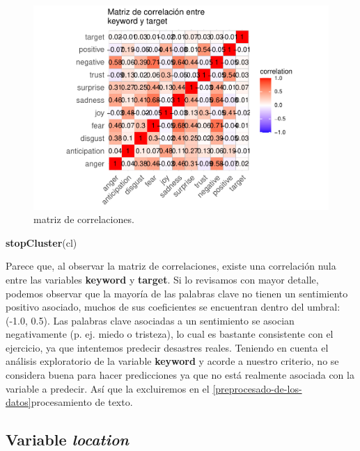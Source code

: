\documentclass[]{article}
\newenvironment{Shaded}{\begin{snugshade}}{\end{snugshade}}
\newcommand{\KeywordTok}[1]{\textcolor[rgb]{0.13,0.29,0.53}{\textbf{#1}}}
\newcommand{\NormalTok}[1]{#1}
\begin{document}
\begin{figure}
	\begin{center}
		\includegraphics[width=1\linewidth]{document_files/figure-latex/unnamed-chunk-7-1} 
		\caption{matriz de correlaciones.}
		\label{fig: matriz de correlaciones}
	\end{center}
\end{figure}

\begin{Shaded}
\begin{Highlighting}[]
\KeywordTok{stopCluster}\NormalTok{(cl)}
\end{Highlighting}
\end{Shaded}

\newpage

Parece que, al observar la matriz de correlaciones, existe una correlación nula entre las variables \textbf{keyword} y \textbf{target}. Si lo revisamos con mayor detalle, podemos observar que la mayoría de las
palabras clave no tienen un sentimiento positivo asociado, muchos de sus coeficientes se encuentran dentro del umbral: (-1.0, 0.5). Las palabras clave asociadas a un sentimiento se asocian negativamente (p. ej. miedo o
tristeza), lo cual es bastante consistente con el ejercicio, ya que intentemos predecir desastres reales. Teniendo en cuenta el análisis exploratorio de la variable \textbf{keyword} y acorde a nuestro criterio, no se considera buena para hacer predicciones ya que no está realmente asociada con la variable a
predecir. Así que la excluiremos en el \ref{preprocesado-de-los-datos}{procesamiento de texto}.

\hypertarget{variable-location}{%
\subsection{\texorpdfstring{Variable
\emph{location}}{Variable location}}\label{variable-location}}
\end{document}
